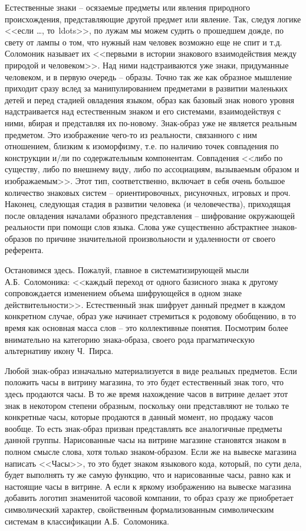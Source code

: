 Естественные знаки -- осязаемые предметы или явления природного происхождения,
представляющие другой предмет или явление. Так, следуя логике <<если \ldots, то\ ldots>>,
по лужам мы можем судить о прошедшем дожде, по свету от лампы о том,
что нужный нам человек возможно еще не спит и т.д. Соломоник называет их
<<первыми в истории знакового взаимодействия между природой и человеком>>.\autocite[][78]{solomonik2009}
Над ними надстраиваются уже знаки, придуманные человеком, и в первую очередь --
образы. Точно так же как образное мышление приходит сразу вслед за
манипулированием предметами в развитии маленьких детей и перед стадией
овладения языком, образ как базовый знак нового уровня надстраивается над
естественным знаком и его системами, взаимодействуя с ними, вбирая и представляя
их по-новому. Знак-образ уже не является реальным предметом. Это изображение
чего-то из реальности, связанного с ним отношением, близким к изоморфизму,
т.е. по наличию точек совпадения по конструкции и/ли по содержательным
компонентам. Совпадения <<либо по существу, либо по внешнему виду, либо по
ассоциациям, вызываемым образом и изображаемым>>.\autocite[][52]{solomonik1995}
Этот тип, соответственно, включает в себя очень большое количество
знаковых систем -- ориентировочных, рисуночных, игровых и проч.
Наконец, следующая стадия в развитии человека (и человечества),
приходящая после овладения началами образного представления -- шифрование
окружающей реальности при помощи слов языка. Слова уже существенно абстрактнее
знаков-образов по причине значительной произвольности и удаленности от
своего референта.

Остановимся здесь. Пожалуй, главное в систематизирующей мысли А.Б.~Соломоника:
<<каждый переход от одного базисного знака к другому сопровождается изменением
объема шифрующейся в одном знаке действительности>>.\autocite[][79]{solomonik2009}
Естественный знак шифрует данный предмет в каждом конкретном случае, образ
уже начинает стремиться к родовому обобщению, в то время как основная
масса слов -- это коллективные понятия. Посмотрим более внимательно на категорию
знака-образа, своего рода прагматическую альтернативу икону Ч.~Пирса.

Любой знак-образ изначально материализуется в виде реальных предметов.
Если положить часы в витрину магазина, то это будет естественный знак того,
что здесь продаются часы. В то же время нахождение часов в витрине делает
этот знак в некотором степени образным, поскольку они представляют не только
те конкретные часы, которые продаются в данный момент, но продажу часов вообще.
То есть знак-образ призван представлять все аналогичные предметы данной группы.
Нарисованные часы на витрине магазине становятся знаком в полном смысле слова,
хотя только знаком-образом. Если же на вывеске магазина написать <<Часы>>,
то это будет знаком языкового кода, который, по сути дела, будет выполнять
ту же самую функцию, что и нарисованные часы, равно как и настоящие часы в
витрине. А если к яркому изображению на вывеске магазина добавить логотип
знаменитой часовой компании, то образ сразу же приобретает символический
характер, свойственным формализованным символическим системам в классификации
А.Б.~Соломоника.

